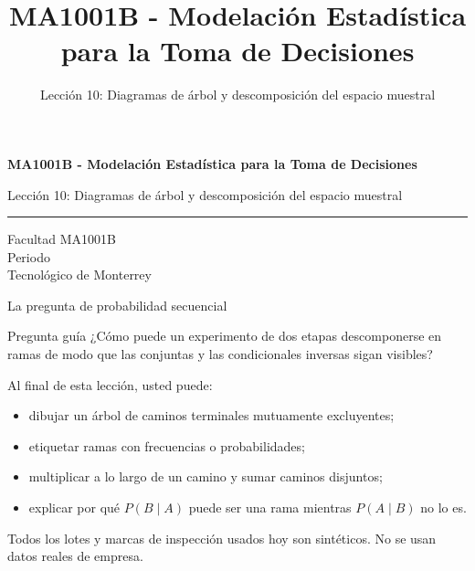 \documentclass[aspectratio=169,10pt,spanish]{beamer}
\title{MA1001B - Modelación Estadística para la Toma de Decisiones}
\subtitle{Lección 10: Diagramas de árbol y descomposición del espacio muestral}
\author{}
\institute{Tecnol\'ogico de Monterrey}
\date{}
\begin{document}
\begin{frame}[plain]
  \vspace{1.2cm}
  {\Large\bfseries MA1001B - Modelación Estadística para la Toma de Decisiones\par}
  \vspace{0.7cm}
  {\large Lección 10: Diagramas de árbol y descomposición del espacio muestral\par}
  \vspace{0.7cm}
  {\color{TecRojo}\rule{\textwidth}{1.2pt}}
  \vspace{0.8cm}

  Facultad MA1001B\\[0.3cm]
  Periodo\\[0.3cm]
  Tecnol\'ogico de Monterrey
\end{frame}

\begin{frame}{La pregunta de probabilidad secuencial}
  \begin{alertblock}{Pregunta guía}
    ¿Cómo puede un experimento de dos etapas descomponerse en ramas de modo
    que las conjuntas y las condicionales inversas sigan visibles?
  \end{alertblock}

  \vspace{0.6em}
  Al final de esta lección, usted puede:
  \begin{itemize}
    \item dibujar un árbol de caminos terminales mutuamente excluyentes;
    \item etiquetar ramas con frecuencias o probabilidades;
    \item multiplicar a lo largo de un camino y sumar caminos disjuntos;
    \item explicar por qué $P(B\mid A)$ puede ser una rama mientras $P(A\mid B)$
      no lo es.
  \end{itemize}

  \vfill
  \scriptsize Todos los lotes y marcas de inspección usados hoy son sintéticos. No se usan datos reales de empresa.
\end{frame}
\end{document}
